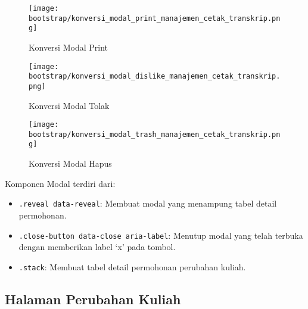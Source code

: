 \begin{figure} [H]
	\centering  
	\texttt{[image: bootstrap/konversi\_modal\_print\_manajemen\_cetak\_transkrip.png]}
	\caption{Konversi Modal Print} 
\end{figure}
\begin{figure} [H]
	\centering  
	\texttt{[image: bootstrap/konversi\_modal\_dislike\_manajemen\_cetak\_transkrip.png]}
	\caption{Konversi Modal Tolak} 
\end{figure}
\begin{figure} [H]
	\centering  
	\texttt{[image: bootstrap/konversi\_modal\_trash\_manajemen\_cetak\_transkrip.png]}
	\caption{Konversi Modal Hapus} 
\end{figure}
Komponen Modal terdiri dari:
\begin{itemize}
	\item \texttt{.reveal data-reveal}: Membuat modal yang menampung tabel detail permohonan.
	\item \texttt{.close-button data-close aria-label}: Menutup modal yang telah terbuka dengan memberikan label `x' pada tombol.
	\item \texttt{.stack}:	Membuat tabel detail permohonan perubahan kuliah.
\end{itemize}


\subsection{Halaman Perubahan Kuliah}
